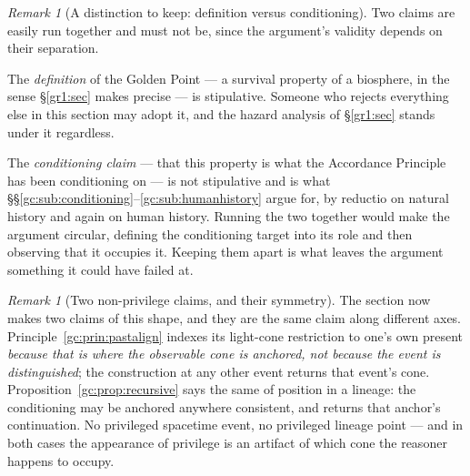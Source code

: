 \documentclass[11pt]{article}
\numberwithin{equation}{section}
\theoremstyle{plain}
\theoremstyle{definition}
\theoremstyle{remark}
\newtheorem{remark}[theorem]{Remark}
\begin{document}
\begin{remark}[A distinction to keep: definition versus conditioning]
\label{gc:rem:defvscond}
Two claims are easily run together and must not be, since the argument's
validity depends on their separation.

The \emph{definition} of the Golden Point --- a survival property of a
biosphere, in the sense \S\ref{gr1:sec} makes precise --- is
stipulative. Someone who rejects everything else in this section may
adopt it, and the hazard analysis of \S\ref{gr1:sec} stands under it
regardless.

The \emph{conditioning claim} --- that this property is what the
Accordance Principle has been conditioning on --- is not stipulative and
is what \S\S\ref{gc:sub:conditioning}--\ref{gc:sub:humanhistory} argue
for, by reductio on natural history and again on human history. Running
the two together would make the argument circular, defining the
conditioning target into its role and then observing that it occupies
it. Keeping them apart is what leaves the argument something it could
have failed at.
\end{remark}

\begin{remark}[Two non-privilege claims, and their symmetry]
\label{gc:rem:twoprivilege}
The section now makes two claims of this shape, and they are the same
claim along different axes.
Principle~\ref{gc:prin:pastalign} indexes its light-cone restriction to
one's own present \emph{because that is where the observable cone is
anchored, not because the event is distinguished}; the construction at
any other event returns that event's cone.
Proposition~\ref{gc:prop:recursive} says the same of position in a
lineage: the conditioning may be anchored anywhere consistent, and
returns that anchor's continuation. No privileged spacetime event, no
privileged lineage point --- and in both cases the appearance of
privilege is an artifact of which cone the reasoner happens to occupy.
\end{remark}
\end{document}
